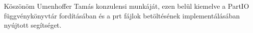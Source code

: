 Köszönöm Umenhoffer Tamás konzulensi munkáját, 
ezen belül kiemelve a PartIO függvénykönyvtár fordításában és 
a prt fájlok betöltésének implementálásában nyújtott segítséget.